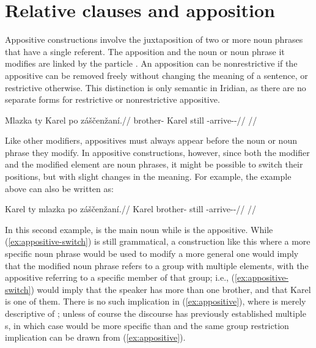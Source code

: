\section{Relative clauses and apposition}
\label{sec:relative-clauses}

Appositive constructions involve the juxtaposition of two or
more noun phrases that have a single referent. The apposition and the noun or
noun phrase it modifies are linked by the particle . An apposition can
be nonrestrictive if the appositive can be removed freely without changing the
meaning of a sentence, or restrictive otherwise. This distinction is only
semantic in Iridian, as there are no separate forms for restrictive or
nonrestrictive appositive.

\pex\label{ex:appositive}
\begingl
  \gla Mlazka ty Karel po záščenžaní.//
  \glb brother-\Dim{} \Lnk{} Karel still \Neg{}-arrive-\Av{}-\Ret{}//
  \glft {}//
\endgl
\xe

Like other modifiers, appositives must always appear before the noun or noun
phrase they modify. In appositive constructions, however, since both the
modifier and the modified element are noun phrases, it might be possible to
switch their positions, but with slight changes in the meaning. For example, the
example above can also be written as:

\pex\label{ex:appositive-switch}
\begingl
  \gla {}Karel ty mlazka po záščenžaní.//
  \glb Karel \Lnk{} brother-\Dim{} still \Neg{}-arrive-\Av{}-\Ret{}//
  \glft {}//
\endgl
\xe

In this second example,  is the main noun while  is the
appositive. While (\ref{ex:appositive-switch}) is still grammatical, a
construction like this where a more specific noun phrase would be used to modify
a more general one would imply that the modified noun phrase refers to a group
with multiple elements, with the appositive referring to a specific member of
that group; i.e., (\ref{ex:appositive-switch}) would imply that the speaker has
more than one brother, and that Karel is one of them. There is no such
implication in (\ref{ex:appositive}), where  is merely descriptive
of ; unless of course the discourse has previously established
multiple s, in which case  would be more specific than
 and the same group restriction implication can be drawn from
(\ref{ex:appositive}).

